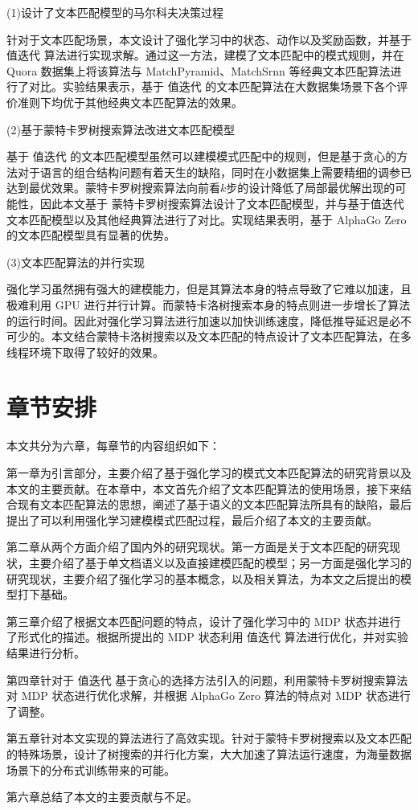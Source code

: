 (1)设计了文本匹配模型的马尔科夫决策过程

针对于文本匹配场景，本文设计了强化学习中的状态、动作以及奖励函数，并基于 值迭代 算法进行实现求解。通过这一方法，建模了文本匹配中的模式规则，并在 Quora 数据集上将该算法与 MatchPyramid、MatchSrnn 等经典文本匹配算法进行了对比。实验结果表示，基于 值迭代 的文本匹配算法在大数据集场景下各个评价准则下均优于其他经典文本匹配算法的效果。

(2)基于蒙特卡罗树搜索算法改进文本匹配模型

基于 值迭代 的文本匹配模型虽然可以建模模式匹配中的规则，但是基于贪心的方法对于语言的组合结构问题有着天生的缺陷，同时在小数据集上需要精细的调参已达到最优效果。蒙特卡罗树搜索算法向前看$k$步的设计降低了局部最优解出现的可能性，因此本文基于 蒙特卡罗树搜索算法设计了文本匹配模型，并与基于值迭代 文本匹配模型以及其他经典算法进行了对比。实现结果表明，基于 AlphaGo Zero 的文本匹配模型具有显著的优势。

(3)文本匹配算法的并行实现

强化学习虽然拥有强大的建模能力，但是其算法本身的特点导致了它难以加速，且极难利用 GPU 进行并行计算。而蒙特卡洛树搜索本身的特点则进一步增长了算法的运行时间。因此对强化学习算法进行加速以加快训练速度，降低推导延迟是必不可少的。本文结合蒙特卡洛树搜索以及文本匹配的特点设计了文本匹配算法，在多线程环境下取得了较好的效果。

\section{章节安排}
本文共分为六章，每章节的内容组织如下：

第一章为引言部分，主要介绍了基于强化学习的模式文本匹配算法的研究背景以及本文的主要贡献。在本章中，本文首先介绍了文本匹配算法的使用场景，接下来结合现有文本匹配算法的思想，阐述了基于语义的文本匹配算法所具有的缺陷，最后提出了可以利用强化学习建模模式匹配过程，最后介绍了本文的主要贡献。

第二章从两个方面介绍了国内外的研究现状。第一方面是关于文本匹配的研究现状，主要介绍了基于单文档语义以及直接建模匹配的模型；另一方面是强化学习的研究现状，主要介绍了强化学习的基本概念，以及相关算法，为本文之后提出的模型打下基础。

第三章介绍了根据文本匹配问题的特点，设计了强化学习中的 MDP 状态并进行了形式化的描述。根据所提出的 MDP 状态利用 值迭代 算法进行优化，并对实验结果进行分析。

第四章针对于 值迭代 基于贪心的选择方法引入的问题，利用蒙特卡罗树搜索算法对 MDP 状态进行优化求解，并根据 AlphaGo Zero 算法的特点对 MDP 状态进行了调整。

第五章针对本文实现的算法进行了高效实现。针对于蒙特卡罗树搜索以及文本匹配的特殊场景，设计了树搜索的并行化方案，大大加速了算法运行速度，为海量数据场景下的分布式训练带来的可能。

第六章总结了本文的主要贡献与不足。

